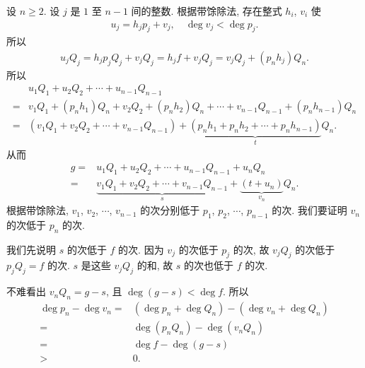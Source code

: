 \begin{pf}
    设 $n \geq 2$. 设 $j$ 是 $1$ 至 $n-1$ 间的整数. 根据带馀除法, 存在整式 $h_i$, $v_i$ 使
    \begin{align*}
        u_j = h_j p_j + v_j, \quad \deg v_j < \deg p_j.
    \end{align*}
    所以
    \begin{align*}
        u_j Q_j = h_j p_j Q_j + v_j Q_j = h_j f + v_j Q_j = v_j Q_j + (p_n h_j) Q_n.
    \end{align*}
    所以
    \begin{align*}
             & u_1 Q_1 + u_2 Q_2 + \cdots + u_{n-1} Q_{n-1}                                                                      \\
        = {} & v_1 Q_1 + (p_n h_1) Q_n + v_2 Q_2 + (p_n h_2) Q_n + \cdots + v_{n-1} Q_{n-1} + (p_n h_{n-1}) Q_n                  \\
        = {} & (v_1 Q_1 + v_2 Q_2 + \cdots + v_{n-1} Q_{n-1}) + \underbrace{(p_n h_1 + p_n h_2 + \cdots + p_n h_{n-1})}_{t} Q_n.
    \end{align*}
    从而
    \begin{align*}
        g
        = {} & u_1 Q_1 + u_2 Q_2 + \cdots + u_{n-1} Q_{n-1} + u_n Q_n                                              \\
        = {} & {\underbrace{v_1 Q_1 + v_2 Q_2 + \cdots + v_{n-1} Q_{n-1}}_{s}} + \underbrace{(t + u_n)}_{v_n} Q_n.
    \end{align*}
    根据带馀除法, $v_1$, $v_2$, $\cdots$, $v_{n-1}$ 的次分别低于 $p_1$, $p_2$, $\cdots$, $p_{n-1}$ 的次. 我们要证明 $v_n$ 的次低于 $p_n$ 的次.

    我们先说明 $s$ 的次低于 $f$ 的次. 因为 $v_j$ 的次低于 $p_j$ 的次, 故 $v_j Q_j$ 的次低于 $p_j Q_j = f$ 的次. $s$ 是这些 $v_j Q_j$ 的和, 故 $s$ 的次也低于 $f$ 的次.

    不难看出 $v_n Q_n = g - s$, 且 $\deg {(g - s)} < \deg f$. 所以
    \begin{align*}
        \deg p_n - \deg v_n
        = {} & (\deg p_n + \deg Q_n) - (\deg v_n + \deg Q_n) \\
        = {} & \deg {(p_n Q_n)} - \deg {(v_n Q_n)}           \\
        = {} & \deg f - \deg {(g - s)}                       \\
        > {} & 0.
    \end{align*}


\end{pf}
